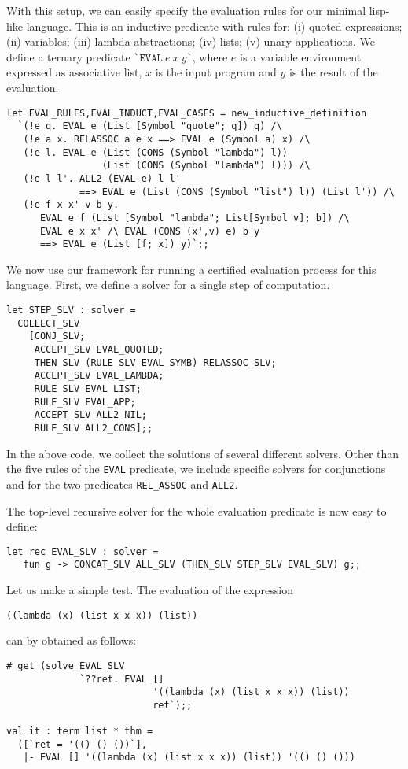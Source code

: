 With this setup, we can easily specify the evaluation rules for our
minimal lisp-like language.  This is an inductive predicate with rules
for: (i) quoted expressions; (ii) variables; (iii) lambda
abstractions; (iv) lists; (v) unary applications.  We define a ternary
predicate \verb|`|$\mathtt{EVAL}\ e\ x\ y\mathtt{}$\verb|`|, where $e$
is a variable environment expressed as associative list, $x$ is the
input program and $y$ is the result of the evaluation.
\begin{verbatim}
let EVAL_RULES,EVAL_INDUCT,EVAL_CASES = new_inductive_definition
  `(!e q. EVAL e (List [Symbol "quote"; q]) q) /\
   (!e a x. RELASSOC a e x ==> EVAL e (Symbol a) x) /\
   (!e l. EVAL e (List (CONS (Symbol "lambda") l))
                 (List (CONS (Symbol "lambda") l))) /\
   (!e l l'. ALL2 (EVAL e) l l'
             ==> EVAL e (List (CONS (Symbol "list") l)) (List l')) /\
   (!e f x x' v b y.
      EVAL e f (List [Symbol "lambda"; List[Symbol v]; b]) /\
      EVAL e x x' /\ EVAL (CONS (x',v) e) b y
      ==> EVAL e (List [f; x]) y)`;;
\end{verbatim}

We now use our framework for running a certified evaluation process
for this language.  First, we define a solver for a single step of
computation.
\begin{verbatim}
let STEP_SLV : solver =
  COLLECT_SLV
    [CONJ_SLV;
     ACCEPT_SLV EVAL_QUOTED;
     THEN_SLV (RULE_SLV EVAL_SYMB) RELASSOC_SLV;
     ACCEPT_SLV EVAL_LAMBDA;
     RULE_SLV EVAL_LIST;
     RULE_SLV EVAL_APP;
     ACCEPT_SLV ALL2_NIL;
     RULE_SLV ALL2_CONS];;
\end{verbatim}
In the above code, we collect the solutions of several different
solvers.  Other than the five rules of the \verb|EVAL| predicate, we
include specific solvers for conjunctions and for the two predicates
\verb|REL_ASSOC| and \verb|ALL2|.

The top-level recursive solver for the whole evaluation predicate is now easy to define:
\begin{verbatim}
let rec EVAL_SLV : solver =
   fun g -> CONCAT_SLV ALL_SLV (THEN_SLV STEP_SLV EVAL_SLV) g;;
\end{verbatim}

Let us make a simple test.  The evaluation of the expression
\begin{verbatim}
((lambda (x) (list x x x)) (list))
\end{verbatim}
can by obtained as follows:
\begin{verbatim}
# get (solve EVAL_SLV
             `??ret. EVAL []
                          '((lambda (x) (list x x x)) (list))
                          ret`);;

val it : term list * thm =
  ([`ret = '(() () ())`],
   |- EVAL [] '((lambda (x) (list x x x)) (list)) '(() () ()))
\end{verbatim}

